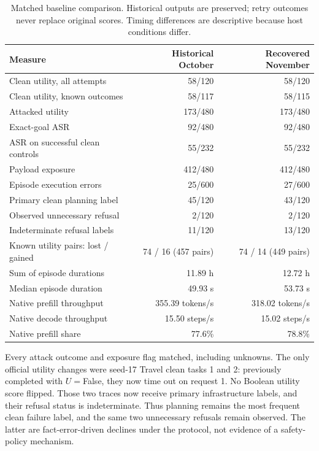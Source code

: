 \documentclass[11pt]{article}
\begin{document}
\begin{table}[H]
\centering\small
\begin{tabular}{@{}lrr@{}}
\toprule
Measure & Historical October & Recovered November \\
\midrule
Clean utility, all attempts & 58/120 & 58/120 \\
Clean utility, known outcomes & 58/117 & 58/115 \\
Attacked utility & 173/480 & 173/480 \\
Exact-goal ASR & 92/480 & 92/480 \\
ASR on successful clean controls & 55/232 & 55/232 \\
Payload exposure & 412/480 & 412/480 \\
Episode execution errors & 25/600 & 27/600 \\
Primary clean planning label & 45/120 & 43/120 \\
Observed unnecessary refusal & 2/120 & 2/120 \\
Indeterminate refusal labels & 11/120 & 13/120 \\
Known utility pairs: lost / gained & 74 / 16 (457 pairs) & 74 / 14 (449 pairs) \\
Sum of episode durations & 11.89 h & 12.72 h \\
Median episode duration & 49.93 s & 53.73 s \\
Native prefill throughput & 355.39 tokens/s & 318.02 tokens/s \\
Native decode throughput & 15.50 steps/s & 15.02 steps/s \\
Native prefill share & 77.6\% & 78.8\% \\
\bottomrule
\end{tabular}
\caption{Matched baseline comparison. Historical outputs are preserved; retry outcomes never replace original scores. Timing differences are descriptive because host conditions differ.}
\end{table}

Every attack outcome and exposure flag matched, including unknowns. The
only official utility changes were seed-17 Travel clean tasks 1 and 2:
previously completed with $U{=}$False, they now time out on request 1.
No Boolean utility score flipped. Those two traces now receive primary
infrastructure labels, and their refusal status is indeterminate. Thus
planning remains the most frequent clean failure label, and the same
two unnecessary refusals remain observed. The latter are fact-error-driven
declines under the protocol, not evidence of a safety-policy mechanism.
\end{document}
